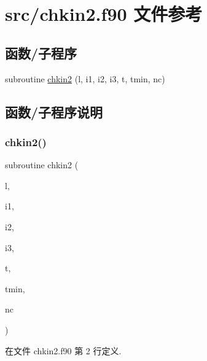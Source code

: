 \hypertarget{chkin2_8f90}{}\section{src/chkin2.f90 文件参考}
\label{chkin2_8f90}
\subsection*{函数/子程序}
\begin{DoxyCompactItemize}
\item 
subroutine \mbox{\hyperlink{chkin2_8f90_a6ccef5f9cf1733d94f1a696668422086}{chkin2}} (l, i1, i2, i3, t, tmin, nc)
\end{DoxyCompactItemize}


\subsection{函数/子程序说明}
\mbox{\label{chkin2_8f90_a6ccef5f9cf1733d94f1a696668422086}} 
\subsubsection{\texorpdfstring{chkin2()}{chkin2()}}
{\footnotesize\ttfamily subroutine chkin2 (\begin{DoxyParamCaption}\item[{}]{l,  }\item[{}]{i1,  }\item[{}]{i2,  }\item[{}]{i3,  }\item[{}]{t,  }\item[{}]{tmin,  }\item[{}]{nc }\end{DoxyParamCaption})}



在文件 chkin2.\+f90 第 2 行定义.

